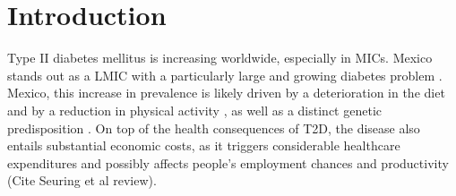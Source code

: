 \section{\label{sec:Introduction}Introduction}

Type II diabetes mellitus is increasing worldwide, especially in \ac{MICs}.
Mexico stands out as a LMIC with a particularly large and growing
diabetes problem \citep{InternationalDiabetesFederation2013}.%
Mexico, this increase in prevalence is likely driven by a deterioration
in the diet and by a reduction in physical activity \citep{Barquera2008b,Basu2013},
as well as a distinct genetic predisposition \citep{Williams2013}.
On top of the health consequences of \ac{T2D}, the disease also
entails substantial economic costs, as it triggers considerable healthcare
expenditures and possibly affects people's employment chances and
productivity (Cite Seuring et al review).

